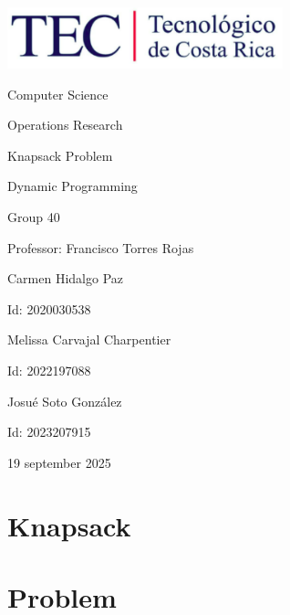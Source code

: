 \documentclass{article}
\begin{document}
\begin{titlepage}
    \centering
    \includegraphics[width=0.6\textwidth]{logo-tec.png}\par\vspace{1cm}

    {\large Computer Science\par}
    {\large Operations Research\par}
    \vspace{2cm}

    {\Large Knapsack Problem\par}
    {\large Dynamic Programming\par}
    \vspace{2cm}

    {\large Group 40\par}
    {\large Professor: Francisco Torres Rojas\par}
    \vspace{3cm}

    {\large Carmen Hidalgo Paz\par}
    {\large Id: 2020030538\par}
    \vspace{1cm}
    {\large Melissa Carvajal Charpentier\par}
    {\large Id: 2022197088\par}
    \vspace{1cm}
    {\large Josué Soto González\par}
    {\large Id: 2023207915\par}
    \vspace{1cm}

    {\large 19 september 2025\par}
\end{titlepage}

\newpage


\section{Knapsack}
\section{Problem}
\end{document}
